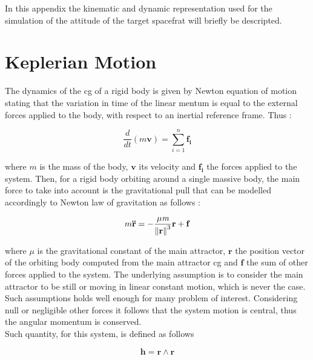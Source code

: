 In this appendix the kinematic and dynamic representation used for the simulation of the attitude of the target spacefrat will briefly be descripted.

\section{Keplerian Motion}
The dynamics of the \acrshort{cg} of a rigid body is given by Newton equation of motion stating that the variation in time of the linear mentum is equal to the external forces applied to the body, with respect to an inertial reference frame. Thus : 

\begin{equation}
 \frac{d}{dt} (\textit{m} \mathbf{v}) = \sum\limits_{i=1}^n \mathbf{f_i}
\end{equation}

where $\textit{m}$ is the mass of the body, $\mathbf{v}$ its velocity and $\mathbf{f_i}$ the forces applied to the system. Then, for a rigid body orbiting around a single massive body, the main force to take into account is the gravitational pull that can be modelled accordingly to Newton law of gravitation as follows : 

\begin{equation}
 \label{eqn:orbiteqtn}
 m \mathbf{\ddot{r}} = - \frac{\mu \textit{m}} {\left\lVert\mathbf{r}\right\rVert^3} \mathbf{r} + \mathbf{f}
\end{equation}

where $\mu$ is the gravitational constant of the main attractor, $\mathbf{r}$ the position vector of the orbiting body computed from the main attractor \acrshort{cg} and $\mathbf{f}$ the sum of other forces applied to the system. The underlying assumption is to consider the main attractor to be still or moving in linear constant motion, which is never the case. Such assumptions holds well enough for many problem of interest. Considering null or negligible other forces it follows that the system motion is central, thus the angular momentum is conserved.\\
Such quantity, for this system, is defined as follows

\begin{equation}
 \mathbf{h} = \mathbf{r} \wedge \mathbf{r}
\end{equation}

